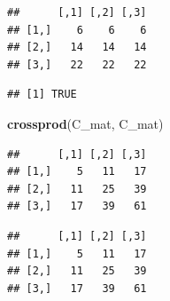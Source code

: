 \documentclass[]{book}
\newenvironment{Shaded}{\begin{snugshade}}{\end{snugshade}}
\newcommand{\KeywordTok}[1]{\textcolor[rgb]{0.13,0.29,0.53}{\textbf{#1}}}
\newcommand{\StringTok}[1]{\textcolor[rgb]{0.31,0.60,0.02}{#1}}
\newcommand{\OperatorTok}[1]{\textcolor[rgb]{0.81,0.36,0.00}{\textbf{#1}}}
\newcommand{\NormalTok}[1]{#1}
\theoremstyle{definition}
\theoremstyle{definition}
\theoremstyle{definition}
\theoremstyle{remark}
\begin{document}
\begin{Shaded}
\end{Shaded}

\begin{verbatim}
##      [,1] [,2] [,3]
## [1,]    6    6    6
## [2,]   14   14   14
## [3,]   22   22   22
\end{verbatim}

\begin{Shaded}
\end{Shaded}

\begin{verbatim}
## [1] TRUE
\end{verbatim}

\begin{Shaded}
\begin{Highlighting}[]
\KeywordTok{crossprod}\NormalTok{(C_mat, C_mat)}
\end{Highlighting}
\end{Shaded}

\begin{verbatim}
##      [,1] [,2] [,3]
## [1,]    5   11   17
## [2,]   11   25   39
## [3,]   17   39   61
\end{verbatim}

\begin{Shaded}
\end{Shaded}

\begin{verbatim}
##      [,1] [,2] [,3]
## [1,]    5   11   17
## [2,]   11   25   39
## [3,]   17   39   61
\end{verbatim}

\begin{Shaded}
\end{Shaded}
\end{document}
